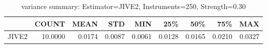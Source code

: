 \begin{table}[ht]
\centering
\caption{variance summary: Estimator=JIVE2, Instruments=250, Strength=0.30}
\begin{tabular}{lrrrrrrrr}
\toprule
 & COUNT & MEAN & STD & MIN & 25\% & 50\% & 75\% & MAX \\
\midrule
JIVE2 & 10.0000 & 0.0174 & 0.0087 & 0.0061 & 0.0128 & 0.0165 & 0.0210 & 0.0327 \\
\bottomrule
\end{tabular}
\end{table}
